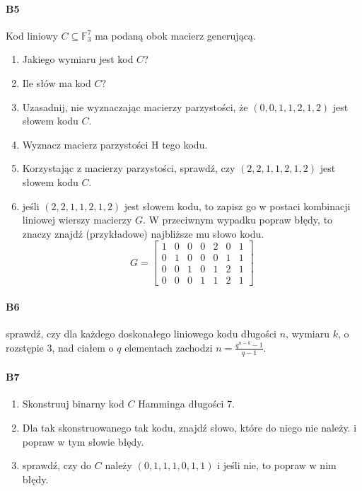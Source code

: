 \paragraph{B5} Kod liniowy $C\subseteq \mathbb{F}_3^7$ ma podaną obok macierz generującą.
\begin{enumerate}[label=\alph*)]
\item Jakiego wymiaru jest kod $C$?
\item Ile słów ma kod $C$?
\item Uzasadnij, nie wyznaczając macierzy parzystości, że $(0,0,1,1,2,1,2)$ jest słowem kodu $C$.
\item Wyznacz macierz parzystości H tego kodu.
\item Korzystając z macierzy parzystości, sprawdź, czy $(2,2,1,1,2,1,2)$ jest słowem kodu $C$.
\item jeśli $(2, 2, 1, 1, 2, 1, 2)$ jest słowem kodu, to zapisz go w postaci kombinacji liniowej wierszy macierzy $G$. W przeciwnym wypadku popraw błędy, to znaczy znajdź (przykładowe) najbliższe mu słowo kodu.
$$G =\begin{bmatrix}
1& 0 &0 &0 &2& 0& 1\\
0& 1& 0& 0& 0& 1& 1\\
0& 0 &1 &0 &1 &2 &1\\
0& 0 &0& 1& 1& 2& 1
\end{bmatrix}$$
\end{enumerate}

\paragraph{B6} sprawdź, czy dla każdego doskonałego liniowego kodu długości $n$, wymiaru $k$, o rozstępie 3, nad ciałem o $q$ elementach zachodzi $n =\frac{q^{n-k}-1}{q-1}$.

\paragraph{B7}
\begin{enumerate}[label=\alph*)]
\item Skonstruuj binarny kod $C$ Hamminga długości $7$.
\item Dla tak skonstruowanego tak kodu, znajdź słowo, które do niego nie należy. i popraw w tym słowie błędy.
\item sprawdź, czy do $C$ należy $(0, 1, 1, 1, 0, 1, 1)$ i jeśli nie, to popraw w nim błędy.
\end{enumerate}


